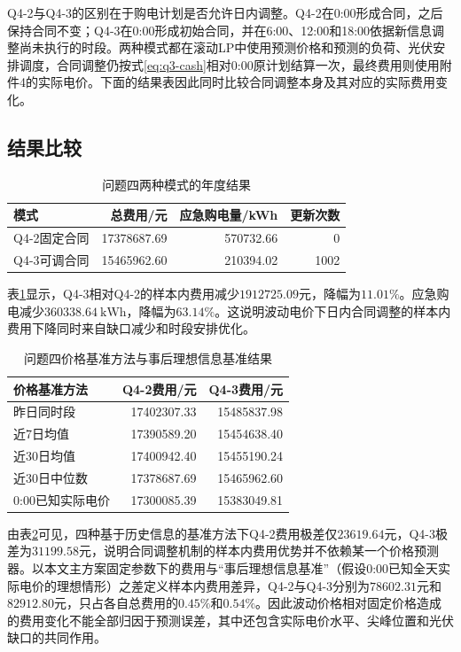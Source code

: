 \documentclass[UTF8,12pt,a4paper]{ctexart}
\theoremstyle{remark}
\begin{document}
Q4-2与Q4-3的区别在于购电计划是否允许日内调整。Q4-2在0:00形成合同，之后保持合同不变；Q4-3在0:00形成初始合同，并在6:00、12:00和18:00依据新信息调整尚未执行的时段。两种模式都在滚动LP中使用预测价格和预测的负荷、光伏安排调度，合同调整仍按式\eqref{eq:q3-cash}相对0:00原计划结算一次，最终费用则使用附件4的实际电价。下面的结果表因此同时比较合同调整本身及其对应的实际费用变化。

\subsection{结果比较}
\begin{table}[H]\centering\caption{问题四两种模式的年度结果}\label{tab:q4-result}
\begin{tabular}{lrrr}\toprule 模式&总费用/元&应急购电量/kWh&更新次数\\\midrule
Q4-2固定合同&17378687.69&570732.66&0\\Q4-3可调合同&15465962.60&210394.02&1002\\\bottomrule\end{tabular}\end{table}
表\ref{tab:q4-result}显示，Q4-3相对Q4-2的样本内费用减少$1912725.09$元，降幅为$11.01\%$。应急购电减少$360338.64\ \mathrm{kWh}$，降幅为$63.14\%$。这说明波动电价下日内合同调整的样本内费用下降同时来自缺口减少和时段安排优化。

\begin{table}[H]\centering\small
\caption{问题四价格基准方法与事后理想信息基准结果}\label{tab:q4-baselines}
\begin{tabular}{lrr}\toprule
价格基准方法&Q4-2费用/元&Q4-3费用/元\\\midrule
昨日同时段&17402307.33&15485837.98\\
近7日均值&17390589.20&15454638.40\\
近30日均值&17400942.40&15455190.24\\
近30日中位数&17378687.69&15465962.60\\
0:00已知实际电价&17300085.39&15383049.81\\\bottomrule
\end{tabular}\end{table}

由表\ref{tab:q4-baselines}可见，四种基于历史信息的基准方法下Q4-2费用极差仅$23619.64$元，Q4-3极差为$31199.58$元，说明合同调整机制的样本内费用优势并不依赖某一个价格预测器。以本文主方案固定参数下的费用与“事后理想信息基准”（假设0:00已知全天实际电价的理想情形）之差定义样本内费用差异，Q4-2与Q4-3分别为$78602.31$元和$82912.80$元，只占各自总费用的$0.45\%$和$0.54\%$。因此波动价格相对固定价格造成的费用变化不能全部归因于预测误差，其中还包含实际电价水平、尖峰位置和光伏缺口的共同作用。
\end{document}
